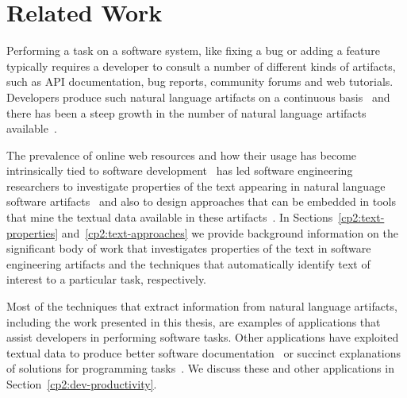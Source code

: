 \setcounter{chapter}{1}


\chapter{Related Work}
\label{ch:related-work}








Performing a task on a software system, like fixing a bug
or adding a feature typically requires a developer to consult
a number of different kinds of artifacts, such
as API documentation, bug reports, community forums
and web tutorials. 
Developers produce such natural language artifacts on a 
continuous basis~\cite{Rastkar2013t} 
and there has been a steep growth in the number 
of natural language artifacts available~\cite{Bavota2016, aa}.


The prevalence of online web resources and how their usage has become intrinsically tied to software development~\cite{} has led 
 software engineering researchers to 
investigate 
properties of the text 
appearing in natural language software artifacts~\cite{aa}
and also to design approaches that 
can be embedded in
tools that mine the textual data available in these artifacts~\cite{aa}.
In Sections~\ref{cp2:text-properties} and~\ref{cp2:text-approaches}
we  provide background information on the significant body 
of work that investigates properties of the text in software engineering 
artifacts and the techniques that automatically identify text of interest 
to a particular task, respectively.







Most of the techniques that extract information from natural 
language artifacts, including the work presented in this thesis, 
are examples of applications that assist developers in performing 
software tasks. 
Other applications have exploited textual data
to produce better software documentation~\cite{Treude2016, mcburney2014, robillard2017} 
or  succinct  explanations of solutions for programming tasks~\cite{silva2019}.
We discuss these and other applications in Section~\ref{cp2:dev-productivity}.







% 

% 


% 

% 


% 
% 
% 